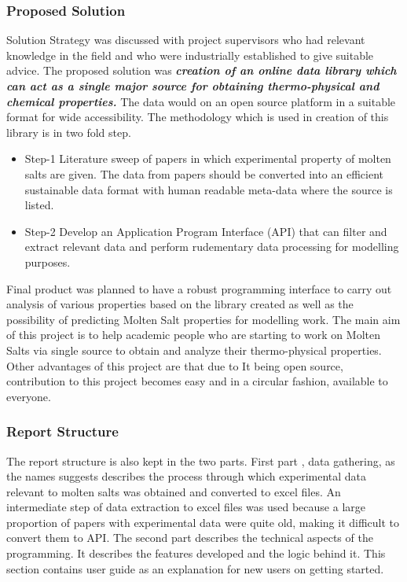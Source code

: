 \subsubsection{Proposed Solution}
Solution Strategy was discussed with project supervisors who had relevant knowledge in the field and who were industrially established to give suitable advice. The proposed solution was \textbf{\textit{creation of an online data library which can act as a single major source for obtaining thermo-physical and chemical properties.}} The data would on an open source platform in a suitable format for wide accessibility. The methodology which is used in creation of this library is in two fold step. 
\begin{itemize} 
\item Step-1 Literature sweep of papers in which experimental property of molten salts are given. The data from papers should be converted into an efficient sustainable data format with human readable meta-data where the source is listed.
\item Step-2 Develop an Application Program Interface (API) that can filter and extract relevant data and perform rudementary data processing for modelling purposes.
\end{itemize}

Final product was planned to have a robust programming interface to carry out analysis of various properties based on the library created as well as the possibility of predicting Molten Salt properties for modelling work. The main aim of this project is to help academic people who are starting to work on Molten Salts via single source to obtain and analyze their thermo-physical properties. Other advantages of this project are that due to It being open source, contribution to this project becomes easy and in a circular fashion, available to everyone. \newline


\subsubsection{Report Structure}
The report structure is also kept in the two parts. First part , data gathering, as the names suggests describes the process through which experimental data relevant to molten salts was obtained and converted to excel files. An intermediate step of data extraction to excel files was used because a large proportion of papers with experimental data were quite old, making it difficult to convert them to API. The second part describes the technical aspects of the programming. It describes the features developed and the logic behind it. This section contains user guide as an explanation for new users on getting started.  \newpage
